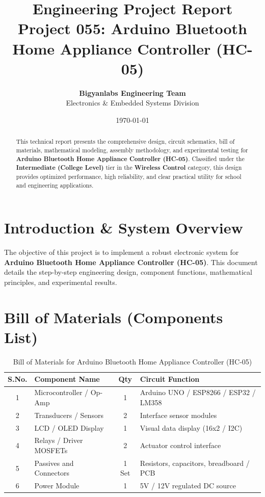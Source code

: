 \documentclass[11pt,a4paper]{article}
\title{\textbf{\Huge Engineering Project Report}\\[0.5em] \Large Project 055: Arduino Bluetooth Home Appliance Controller (HC-05)}
\author{\textbf{Bigyanlabs Engineering Team}\\ Electronics \& Embedded Systems Division}
\date{\today}
\begin{document}
\maketitle
\thispagestyle{empty}

\begin{abstract}
This technical report presents the comprehensive design, circuit schematics, bill of materials, mathematical modeling, assembly methodology, and experimental testing for \textbf{Arduino Bluetooth Home Appliance Controller (HC-05)}. Classified under the \textbf{Intermediate (College Level)} tier in the \textbf{Wireless Control} category, this design provides optimized performance, high reliability, and clear practical utility for school and engineering applications.
\end{abstract}

\newpage
\tableofcontents
\newpage

\section{Introduction \& System Overview}
The objective of this project is to implement a robust electronic system for \textbf{Arduino Bluetooth Home Appliance Controller (HC-05)}. This document details the step-by-step engineering design, component functions, mathematical principles, and experimental results.

\section{Bill of Materials (Components List)}
\begin{table}[h!]
\centering
\caption{Bill of Materials for Arduino Bluetooth Home Appliance Controller (HC-05)}
\vspace{0.5em}
\begin{tabular}{clcp{7cm}}
\toprule
\textbf{S.No.} & \textbf{Component Name} & \textbf{Qty} & \textbf{Circuit Function} \\
\midrule
1 & Microcontroller / Op-Amp & 1 & Arduino UNO / ESP8266 / ESP32 / LM358 \\
2 & Transducers / Sensors & 2 & Interface sensor modules \\
3 & LCD / OLED Display & 1 & Visual data display (16x2 / I2C) \\
4 & Relays / Driver MOSFETs & 2 & Actuator control interface \\
5 & Passives and Connectors & 1 Set & Resistors, capacitors, breadboard / PCB \\
6 & Power Module & 1 & 5V / 12V regulated DC source \\
\bottomrule
\end{tabular}
\end{table}
\end{document}

